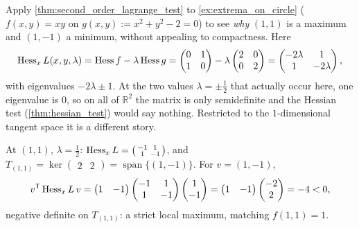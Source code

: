 \begin{example}
\label{ex:second_order_test_on_circle}
Apply \cref{thm:second_order_lagrange_test} to \cref{ex:extrema_on_circle}
($f(x,y)=xy$ on $g(x,y):=x^2+y^2-2=0$) to see \emph{why} $(1,1)$ is a maximum and $(1,-1)$ a
minimum, without appealing to compactness. Here
\[\operatorname{Hess}_xL(x,y,\lambda) = \operatorname{Hess} f - \lambda\operatorname{Hess} g
  = \begin{pmatrix}0&1\\1&0\end{pmatrix} - \lambda\begin{pmatrix}2&0\\0&2\end{pmatrix}
  = \begin{pmatrix}-2\lambda&1\\1&-2\lambda\end{pmatrix},\]
with eigenvalues $-2\lambda\pm1$. At the two values $\lambda = \pm\tfrac12$ that actually occur
here, one eigenvalue is $0$, so on all of $\mathbb{R}^2$ the matrix is only semidefinite and the
Hessian test (\cref{thm:hessian_test}) would say nothing. Restricted to the $1$-dimensional
tangent space it is a different story.

At $(1,1)$, $\lambda=\tfrac12$: $\operatorname{Hess}_xL = \left(\begin{smallmatrix}-1&1\\1&-1\end{smallmatrix}\right)$, and $T_{(1,1)} = \ker\begin{pmatrix}2&2\end{pmatrix} = \operatorname{span}\{(1,-1)\}$. For $v=(1,-1)$,
\[v^{\mathsf{T}}\operatorname{Hess}_xL\,v = \begin{pmatrix}1&-1\end{pmatrix}\begin{pmatrix}-1&1\\1&-1\end{pmatrix}\begin{pmatrix}1\\-1\end{pmatrix} = \begin{pmatrix}1&-1\end{pmatrix}\begin{pmatrix}-2\\2\end{pmatrix} = -4 < 0,\]
negative definite on $T_{(1,1)}$: a strict local maximum, matching $f(1,1)=1$.


\end{example}
